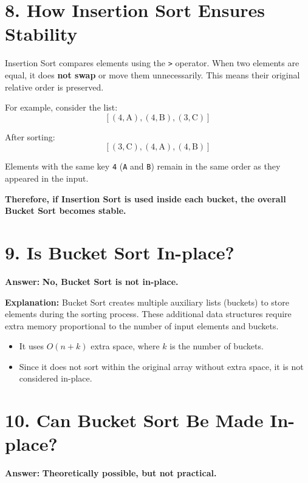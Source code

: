 \documentclass[14pt]{extarticle}
\begin{document}
\section*{8. How Insertion Sort Ensures Stability}

Insertion Sort compares elements using the \texttt{>} operator. When two elements are equal, it does \textbf{not swap} or move them unnecessarily. This means their original relative order is preserved.

\medskip

For example, consider the list:
\[
[ (4, \text{A}), (4, \text{B}), (3, \text{C}) ]
\]

After sorting:
\[
[ (3, \text{C}), (4, \text{A}), (4, \text{B}) ]
\]

Elements with the same key \texttt{4} (\texttt{A} and \texttt{B}) remain in the same order as they appeared in the input.

\medskip

\textbf{Therefore, if Insertion Sort is used inside each bucket, the overall Bucket Sort becomes stable.}

\newpage
\section*{9. Is Bucket Sort In-place?}

\textbf{Answer:} \textbf{No, Bucket Sort is not in-place.}

\medskip

\textbf{Explanation:} Bucket Sort creates multiple auxiliary lists (buckets) to store elements during the sorting process. These additional data structures require extra memory proportional to the number of input elements and buckets.

\begin{itemize}
    \item It uses $O(n + k)$ extra space, where $k$ is the number of buckets.
    \item Since it does not sort within the original array without extra space, it is not considered in-place.
\end{itemize}


\section*{10. Can Bucket Sort Be Made In-place?}

\textbf{Answer:} \textbf{Theoretically possible, but not practical.}

\medskip
\end{document}
